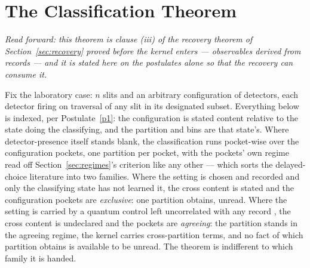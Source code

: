 \section{The Classification Theorem}\label{sec:theorem}

\noindent\emph{Read forward: this theorem is clause (iii) of the recovery theorem of Section~\ref{sec:recovery} proved before the kernel enters --- observables derived from records --- and it is stated here on the postulates alone so that the recovery can consume it.}

Fix the laboratory case: $n$ slits and an arbitrary configuration of detectors, each detector firing on traversal of any slit in its designated subset.
Everything below is indexed, per Postulate~\ref{p1}: the configuration is stated content relative to the state doing the classifying, and the partition and bins are that state's. Where detector-presence itself stands blank, the classification runs pocket-wise over the configuration pockets, one partition per pocket, with the pockets' own regime read off Section~\ref{sec:regimes}'s criterion like any other --- which sorts the delayed-choice literature into two families. Where the setting is chosen and recorded and only the classifying state has not learned it, the cross content is stated and the configuration pockets are \emph{exclusive}: one partition obtains, unread. Where the setting is carried by a quantum control left uncorrelated with any record \cite{ionicioiu2011proposal}, the cross content is undeclared and the pockets are \emph{agreeing}: the partition stands in the agreeing regime, the kernel carries cross-partition terms, and no fact of which partition obtains is available to be unread. The theorem is indifferent to which family it is handed.

